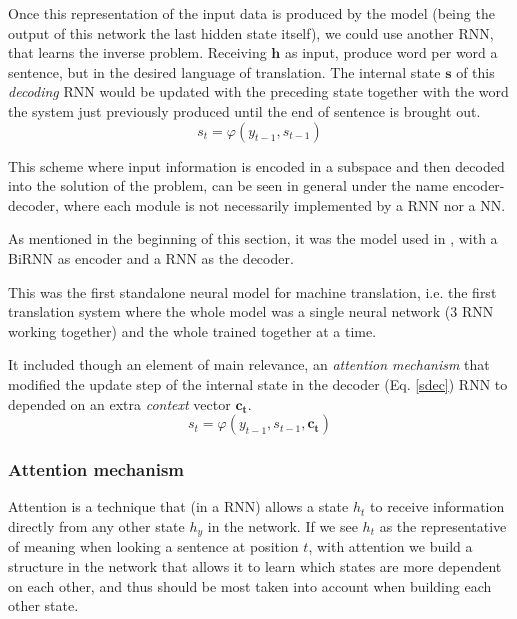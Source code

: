\documentclass[11pt,english,listoffigures,listoftables]{tfgetsinf}
\newcommand{\vect}[1]{\mathbf{#1}}
\begin{document}
Once this representation of the input data is produced by the model (being the output of this network the last hidden state itself), we could use another RNN, that learns the inverse problem. Receiving $\vect{h}$ as input, produce word per word a sentence, but in the desired language of translation. The internal state $\vect{s}$ of this \textit{decoding} RNN would be updated with the preceding state together with the word the system just previously produced until the end of sentence is brought out.
\begin{equation}\label{sdec}
    s_t = \varphi (y_{t-1},s_{t-1})
\end{equation}

This scheme where input information is encoded in a subspace and then decoded into the solution of the problem, can be seen in general under the name encoder-decoder, where each module is not necessarily implemented by a RNN nor a NN.

As mentioned in the beginning of this section, it was the model used in \cite{https://doi.org/10.48550/arxiv.1409.0473}, with a BiRNN as encoder and a RNN as the decoder.

This was the first standalone neural model for machine translation, i.e. the first translation system where the whole model was a single neural network (3 RNN working together) and the whole trained together at a time.

It included though an element of main relevance, an \textit{attention mechanism} that modified the update step of the internal state in the decoder (Eq. \ref{sdec}) RNN to depended on an extra \textit{context} vector $\vect{c_t}$.
\begin{equation}\label{decoc}
    s_t = \varphi (y_{t-1}, s_{t-1}, \vect{c_t})
\end{equation}

\subsubsection{Attention mechanism}

Attention is a technique that (in a RNN) allows a state $h_t$ to receive information directly from any other state $h_y$ in the network. If we see $h_t$ as the representative of meaning when looking a sentence at position $t$, with attention we build a structure in the network that allows it to learn which states are more dependent on each other, and thus should be most taken into account when building each other state. 
\end{document}
